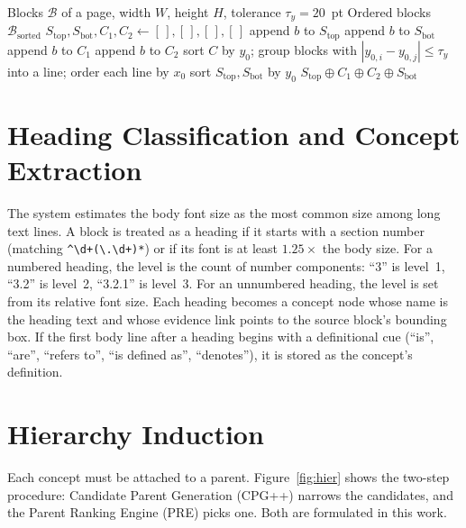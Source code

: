 \documentclass[12pt,a4paper]{report}
\begin{document}
\begin{algorithm}[!htbp]
\caption{Column-Aware 2D Reading-Order Sorting}
\label{alg:reading}
\begin{algorithmic}[1]
\REQUIRE Blocks $\mathcal{B}$ of a page, width $W$, height $H$, tolerance $\tau_y=20$~pt
\ENSURE Ordered blocks $\mathcal{B}_{\text{sorted}}$
\STATE $S_{\text{top}},S_{\text{bot}},C_1,C_2 \leftarrow [\,],[\,],[\,],[\,]$
   \STATE append $b$ to $S_{\text{top}}$
   \STATE append $b$ to $S_{\text{bot}}$
   \STATE append $b$ to $C_1$
  \ELSE \STATE append $b$ to $C_2$ \ENDIF
\ENDFOR
{}
  \STATE sort $C$ by $y_0$; group blocks with $|y_{0,i}-y_{0,j}|\le\tau_y$ into a line; order each line by $x_0$
\ENDFOR
\STATE sort $S_{\text{top}},S_{\text{bot}}$ by $y_0$
\RETURN $S_{\text{top}} \oplus C_1 \oplus C_2 \oplus S_{\text{bot}}$
\end{algorithmic}
\end{algorithm}

\section{Heading Classification and Concept Extraction}
The system estimates the body font size as the most common size among long text lines.
A block is treated as a heading if it starts with a section number (matching
\texttt{\^{}\textbackslash d+(\textbackslash.\textbackslash d+)*}) or if its font is at
least $1.25\times$ the body size. For a numbered heading, the level is the count of
number components: ``3'' is level~1, ``3.2'' is level~2, ``3.2.1'' is level~3. For an
unnumbered heading, the level is set from its relative font size. Each heading becomes a
concept node whose name is the heading text and whose evidence link points to the source
block's bounding box. If the first body line after a heading begins with a definitional
cue (``is'', ``are'', ``refers to'', ``is defined as'', ``denotes''), it is stored as
the concept's definition.

\section{Hierarchy Induction}
Each concept must be attached to a parent. Figure~\ref{fig:hier} shows the two-step
procedure: Candidate Parent Generation (CPG++) narrows the candidates, and the Parent
Ranking Engine (PRE) picks one. Both are formulated in this work.
\end{document}

